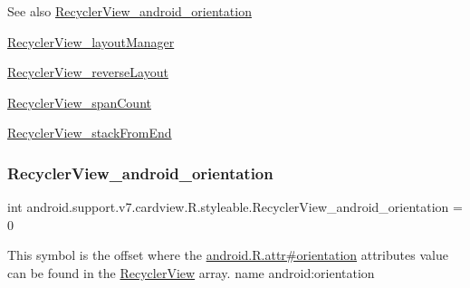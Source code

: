 \begin{DoxySeeAlso}{See also}
\hyperlink{classandroid_1_1support_1_1v7_1_1cardview_1_1R_1_1styleable_adf8efb57acf780289db83215a52f10b1}{Recycler\+View\+\_\+android\+\_\+orientation} 

\hyperlink{classandroid_1_1support_1_1v7_1_1cardview_1_1R_1_1styleable_ab2064e02181e4bf21b2e259e1ac81033}{Recycler\+View\+\_\+layout\+Manager} 

\hyperlink{classandroid_1_1support_1_1v7_1_1cardview_1_1R_1_1styleable_a2aaa2e04e8a3bb8b0988102a9ec55404}{Recycler\+View\+\_\+reverse\+Layout} 

\hyperlink{classandroid_1_1support_1_1v7_1_1cardview_1_1R_1_1styleable_a35481c2d84bd6e50d39d321c7dd041a6}{Recycler\+View\+\_\+span\+Count} 

\hyperlink{classandroid_1_1support_1_1v7_1_1cardview_1_1R_1_1styleable_af94123221870052541c69f6f043aa704}{Recycler\+View\+\_\+stack\+From\+End} 
\end{DoxySeeAlso}
\mbox{\label{classandroid_1_1support_1_1v7_1_1cardview_1_1R_1_1styleable_adf8efb57acf780289db83215a52f10b1}} 
\subsubsection{\texorpdfstring{Recycler\+View\+\_\+android\+\_\+orientation}{RecyclerView\_android\_orientation}}
{\footnotesize\ttfamily int android.\+support.\+v7.\+cardview.\+R.\+styleable.\+Recycler\+View\+\_\+android\+\_\+orientation = 0\hspace{0.3cm}{\ttfamily [static]}}

This symbol is the offset where the \hyperlink{}{android.\+R.\+attr\#orientation} attribute\textquotesingle{}s value can be found in the \hyperlink{classandroid_1_1support_1_1v7_1_1cardview_1_1R_1_1styleable_a65f321ce206d51d7c6ea76d7ea7bbb05}{Recycler\+View} array.  name android\+:orientation \mbox{\label{classandroid_1_1support_1_1v7_1_1cardview_1_1R_1_1styleable_ab2064e02181e4bf21b2e259e1ac81033}} 
